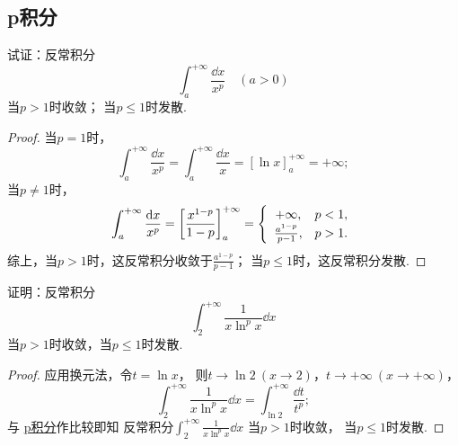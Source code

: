 \subsection{p积分}
\begin{example}[p积分]\label{example:定积分.p积分}
试证：反常积分\[
\int_a^{+\infty} \frac{\dd{x}}{x^p} \quad(a>0)
\]
当\(p > 1\)时收敛；
当\(p \leqslant 1\)时发散.
\begin{proof}
当\(p=1\)时，\[
\int_a^{+\infty} \frac{\dd{x}}{x^p}
= \int_a^{+\infty} \frac{\dd{x}}{x}
= [\ln x]_a^{+\infty} = +\infty;
\]当\(p\neq1\)时，\[
\int_a^{+\infty} \frac{\dd{x}}{x^p}
= \left[ \frac{x^{1-p}}{1-p} \right]_a^{+\infty}
= \left\{ \def\arraystretch{1.2} \begin{array}{cl}
+\infty, & p<1, \\
\frac{a^{1-p}}{p-1}, & p>1.
\end{array} \right.
\]
综上，当\(p > 1\)时，这反常积分收敛于\(\frac{a^{1-p}}{p-1}\)；
当\(p\leqslant1\)时，这反常积分发散.
\end{proof}
\end{example}

\begin{example}
证明：反常积分\[
\int_2^{+\infty} \frac{1}{x \ln^p x} \dd{x}
\]
当\(p>1\)时收敛，当\(p\leqslant1\)时发散.
\begin{proof}
应用换元法，令\(t = \ln x\)，%
则\(t \to \ln2\ (x\to2)\)，\(t \to +\infty\ (x\to+\infty)\)，%
\[
\int_2^{+\infty} \frac{1}{x \ln^p x} \dd{x}
= \int_{\ln2}^{+\infty} \frac{\dd{t}}{t^p};
\]
与 \hyperref[example:定积分.p积分]{p积分}作比较即知%
反常积分\(\int_2^{+\infty} \frac{1}{x \ln^p x} \dd{x}\)%
当\(p>1\)时收敛，%
当\(p\leqslant1\)时发散.
\end{proof}
\end{example}

